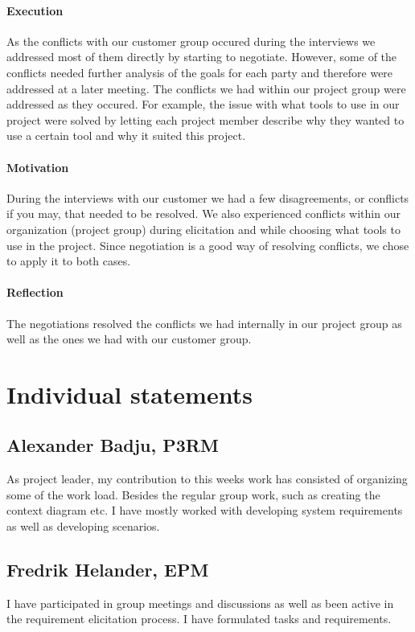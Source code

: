 \documentclass[10pt]{article}
\begin{document}
\paragraph{Execution}
\hfill \break
As the conflicts with our customer group occured during the interviews we addressed most of them directly by starting to negotiate. However, some of the conflicts needed further analysis of the goals for each party and therefore were addressed at a later meeting. The conflicts we had within our project group were addressed as they occured. For example, the issue with what tools to use in our project were solved by letting each project member describe why they wanted to use a certain tool and why it suited this project. 
\paragraph{Motivation}
\hfill \break
During the interviews with our customer we had a few disagreements, or conflicts if you may, that needed to be resolved. We also experienced conflicts within our organization (project group) during elicitation and while choosing what tools to use in the project. Since negotiation is a good way of resolving conflicts, we chose to apply it to both cases.
\paragraph{Reflection}
\hfill \break
The negotiations resolved the conflicts we had internally in our project group as well as the ones we had with our customer group.

\section{Individual statements}
\noindent
\subsection{Alexander Badju, P3RM}
As project leader, my contribution to this weeks work has consisted of organizing some of the work load. Besides the regular group work, such as creating the context diagram etc. I have mostly worked with developing system requirements as well as developing scenarios. 
\subsection{Fredrik Helander, EPM}
I have participated in group meetings and discussions as well as been active in the requirement elicitation process. I have formulated tasks and requirements.  
\end{document}
